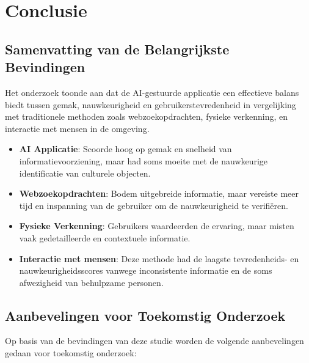 
\chapter{Conclusie}%
\label{ch:conclusie}


\section{Samenvatting van de Belangrijkste Bevindingen}
Het onderzoek toonde aan dat de AI-gestuurde applicatie een effectieve balans biedt tussen gemak, nauwkeurigheid en gebruikerstevredenheid in vergelijking met traditionele methoden zoals webzoekopdrachten, fysieke verkenning, en interactie met mensen in de omgeving.

\begin{itemize}
    \item \textbf{AI Applicatie}: Scoorde hoog op gemak en snelheid van informatievoorziening, maar had soms moeite met de nauwkeurige identificatie van culturele objecten.
    \item \textbf{Webzoekopdrachten}: Bodem uitgebreide informatie, maar vereiste meer tijd en inspanning van de gebruiker om de nauwkeurigheid te verifiëren.
    \item \textbf{Fysieke Verkenning}: Gebruikers waardeerden de ervaring, maar misten vaak gedetailleerde en contextuele informatie.
    \item \textbf{Interactie met mensen}: Deze methode had de laagste tevredenheids- en nauwkeurigheidsscores vanwege inconsistente informatie en de soms afwezigheid van behulpzame personen.
\end{itemize}

\section{Aanbevelingen voor Toekomstig Onderzoek}
Op basis van de bevindingen van deze studie worden de volgende aanbevelingen gedaan voor toekomstig onderzoek:

